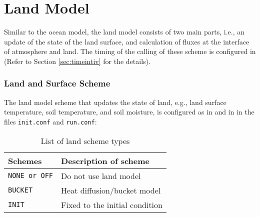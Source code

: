 \section{Land Model} \label{sec:basic_usel_land}
Similar to the ocean model, the land model consists of two main parts, i.e., an update of the state of the land surface, and calculation of fluxes at the interface of atmosphere and land. The timing of the calling of these scheme is configured in  (Refer to Section \ref{sec:timeintiv} for the details).

\subsubsection{Land and Surface Scheme}
The land model scheme that updates the state of land, e.g., land surface temperature, soil temperature, and soil moisture, is configured as in  and  in  in the files \verb|init.conf| and \verb|run.conf|:


\begin{table}[hbt]
\begin{center}
  \caption{List of land scheme types}
  \label{tab:nml_land_dyn}
  \begin{tabularx}{150mm}{lX} \hline
    \rowcolor[gray]{0.9}  Schemes & Description of scheme \\ \hline
      \verb|NONE or OFF| & Do not use land model \\
      \verb|BUCKET|      & Heat diffusion/bucket model \\
      \verb|INIT|        & Fixed to the initial condition \\
    \hline
  \end{tabularx}
\end{center}
\end{table}


